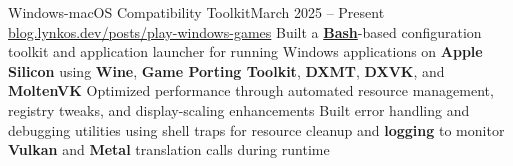 
\subheading
    {Windows-macOS Compatibility Toolkit}{March 2025 -- Present}
    {\href{https://blog.lynkos.dev/posts/play-windows-games}{blog.lynkos.dev/posts/play-windows-games}}{}
    \itemListStart
    \listItem{}
        {Built a \href{https://github.com/lynkos/configs/blob/main/Scripts/gaming_funcs.sh}{\textbf{Bash}}-based configuration toolkit and application launcher for running Windows applications on \textbf{Apple Silicon} using \textbf{Wine}, \textbf{Game Porting Toolkit}, \textbf{DXMT}, \textbf{DXVK}, and \textbf{MoltenVK}} %
    \listItem{}
        {Optimized performance through automated resource management, registry tweaks, and display-scaling enhancements}
    \listItem{}
        {Built error handling and debugging utilities using shell traps for resource cleanup and \textbf{logging} to monitor \textbf{Vulkan} and \textbf{Metal} translation calls during runtime}
    \itemListEnd